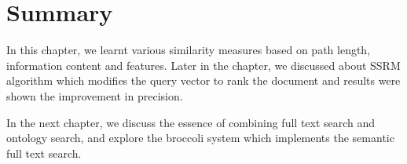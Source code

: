 \section*{Summary}
In this chapter, we learnt various similarity measures based on path length, information content and features. Later in the chapter, we discussed about SSRM algorithm which modifies the query vector to rank the document and results were shown the improvement in precision. 

In the next chapter, we discuss the essence of combining full text search and ontology search, and explore the broccoli system which implements the semantic full text search.